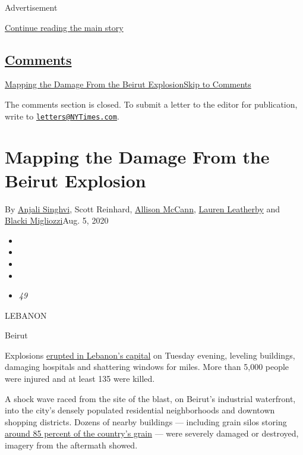 Advertisement

\protect\hyperlink{after-top}{Continue reading the main story}

\hypertarget{comments}{%
\subsection{\texorpdfstring{\protect\hyperlink{commentsContainer}{Comments}}{Comments}}\label{comments}}

\href{}{Mapping the Damage From the Beirut Explosion}\href{}{Skip to
Comments}

The comments section is closed. To submit a letter to the editor for
publication, write to
\href{mailto:letters@NYTimes.com}{\nolinkurl{letters@NYTimes.com}}.

\hypertarget{mapping-the-damage-from-the-beirut-explosion}{%
\section{Mapping the Damage From the Beirut
Explosion}\label{mapping-the-damage-from-the-beirut-explosion}}

By \href{https://www.nytimes3xbfgragh.onion/by/anjali-singhvi}{Anjali
Singhvi}, Scott Reinhard,
\href{https://www.nytimes3xbfgragh.onion/by/allison-mccann}{Allison
McCann},
\href{https://www.nytimes3xbfgragh.onion/by/lauren-leatherby}{Lauren
Leatherby} and
\href{https://www.nytimes3xbfgragh.onion/by/blacki-migliozzi}{Blacki
Migliozzi}Aug. 5, 2020

\begin{itemize}
\item
\item
\item
\item
\item
  \emph{49}
\end{itemize}

LEBANON

Beirut

Explosions
\href{https://www.nytimes3xbfgragh.onion/2020/08/05/world/middleeast/beirut-explosion.html}{erupted
in Lebanon's capital} on Tuesday evening, leveling buildings, damaging
hospitals and shattering windows for miles. More than 5,000 people were
injured and at least 135 were killed.

A shock wave raced from the site of the blast, on Beirut's industrial
waterfront, into the city's densely populated residential neighborhoods
and downtown shopping districts. Dozens of nearby buildings ---
including grain silos storing
\href{https://www.nytimes3xbfgragh.onion/2020/08/05/world/middleeast/beirut-explosion-what-happened.html}{around
85 percent of the country's grain} --- were severely damaged or
destroyed, imagery from the aftermath showed.

